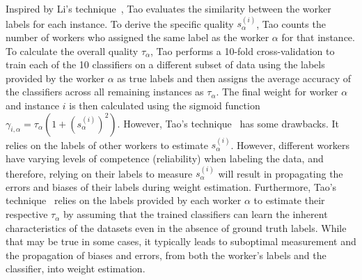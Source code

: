 \documentclass[default]{bst/sn-jnl_mine}%
\begin{document}
Inspired by Li's technique~\cite{li_Incorporating_2018}, Tao evaluates the similarity between the worker labels for each instance. To derive the specific quality $s_{\alpha}^{(i)}$, Tao counts the number of workers who assigned the same label as the worker $\alpha $ for that instance. To calculate the overall quality $\tau_\alpha $, Tao performs a 10-fold cross-validation to train each of the 10 classifiers on a different subset of data using the labels provided by the worker $\alpha $ as true labels and then assigns the average accuracy of the classifiers across all remaining instances as $\tau_\alpha $. The final weight for worker $\alpha $ and instance $i $ is then calculated using the sigmoid function $\gamma_{i,\alpha}=\tau_\alpha\left(1+{\left(s_{\alpha}^{(i)}\right)}^{2}\right) $. However, Tao's technique~\cite{tao_Label_2020} has some drawbacks. It relies on the labels of other workers to estimate $s_{\alpha}^{(i)} $. However, different workers have varying levels of competence (reliability) when labeling the data, and therefore, relying on their labels to measure $s_{\alpha}^{(i)} $ will result in propagating the errors and biases of their labels during weight estimation. Furthermore, Tao's technique~\cite{tao_Label_2020} relies on the labels provided by each worker $\alpha $ to estimate their respective $\tau_\alpha $ by assuming that the trained classifiers can learn the inherent characteristics of the datasets even in the absence of ground truth labels. While that may be true in some cases, it typically leads to suboptimal measurement and the propagation of biases and errors, from both the worker's labels and the classifier, into weight estimation.
\end{document}
